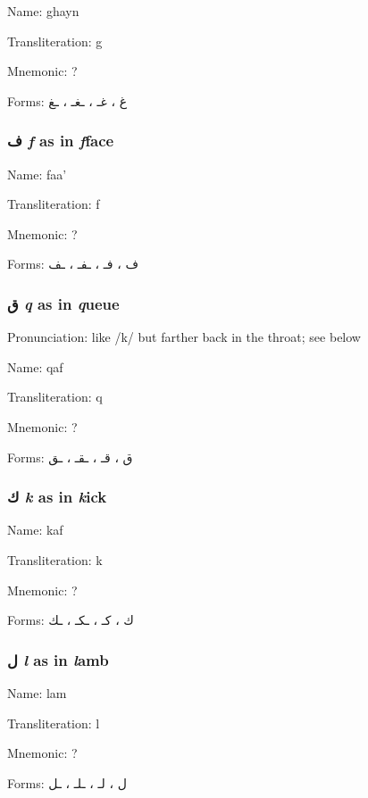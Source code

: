 \documentclass[11pt]{article}
\begin{document}
\noindent Name: ghayn

\noindent Transliteration: g

\noindent Mnemonic:  ?

\noindent Forms: \textarabic{غ ، غـ ، ـغـ ، ـغ}

\subsubsection{ \textarabic{ف} \textit{f} as in \textit{f}face}

\noindent Name: faa'

\noindent Transliteration: f

\noindent Mnemonic:  ?

\noindent Forms: \textarabic{ف ، فـ ، ـفـ ، ـف}

\subsubsection{ \textarabic{ق} \textit{q} as in \textit{q}ueue}
Pronunciation: like /k/ but farther back in the throat; see below

\noindent Name: qaf

\noindent Transliteration: q

\noindent Mnemonic:  ?

\noindent Forms: \textarabic{ق ، قـ ، ـقـ ، ـق}

\subsubsection{ \textarabic{ك} \textit{k} as in \textit{k}ick}

\noindent Name: kaf

\noindent Transliteration: k

\noindent Mnemonic:  ?

\noindent Forms: \textarabic{ك ، كـ ، ـكـ ، ـك}

\subsubsection{ \textarabic{ل} \textit{l} as in \textit{l}amb}

\noindent Name: lam

\noindent Transliteration: l

\noindent Mnemonic:  ?

\noindent Forms: \textarabic{ل ، لـ ، ـلـ ، ـل}
\end{document}
